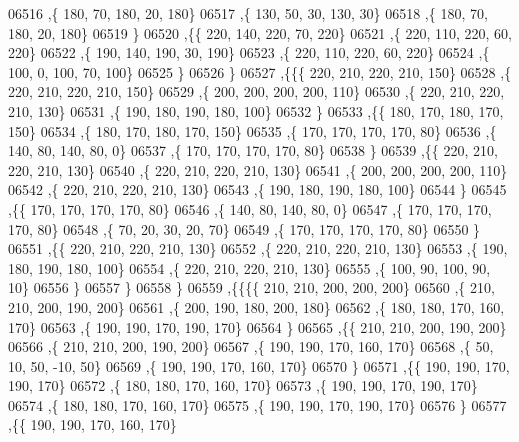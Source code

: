 \begin{DoxyCode}
06516     ,\{   180,    70,   180,    20,   180\}
06517     ,\{   130,    50,    30,   130,    30\}
06518     ,\{   180,    70,   180,    20,   180\}
06519     \}
06520    ,\{\{   220,   140,   220,    70,   220\}
06521     ,\{   220,   110,   220,    60,   220\}
06522     ,\{   190,   140,   190,    30,   190\}
06523     ,\{   220,   110,   220,    60,   220\}
06524     ,\{   100,     0,   100,    70,   100\}
06525     \}
06526    \}
06527   ,\{\{\{   220,   210,   220,   210,   150\}
06528     ,\{   220,   210,   220,   210,   150\}
06529     ,\{   200,   200,   200,   200,   110\}
06530     ,\{   220,   210,   220,   210,   130\}
06531     ,\{   190,   180,   190,   180,   100\}
06532     \}
06533    ,\{\{   180,   170,   180,   170,   150\}
06534     ,\{   180,   170,   180,   170,   150\}
06535     ,\{   170,   170,   170,   170,    80\}
06536     ,\{   140,    80,   140,    80,     0\}
06537     ,\{   170,   170,   170,   170,    80\}
06538     \}
06539    ,\{\{   220,   210,   220,   210,   130\}
06540     ,\{   220,   210,   220,   210,   130\}
06541     ,\{   200,   200,   200,   200,   110\}
06542     ,\{   220,   210,   220,   210,   130\}
06543     ,\{   190,   180,   190,   180,   100\}
06544     \}
06545    ,\{\{   170,   170,   170,   170,    80\}
06546     ,\{   140,    80,   140,    80,     0\}
06547     ,\{   170,   170,   170,   170,    80\}
06548     ,\{    70,    20,    30,    20,    70\}
06549     ,\{   170,   170,   170,   170,    80\}
06550     \}
06551    ,\{\{   220,   210,   220,   210,   130\}
06552     ,\{   220,   210,   220,   210,   130\}
06553     ,\{   190,   180,   190,   180,   100\}
06554     ,\{   220,   210,   220,   210,   130\}
06555     ,\{   100,    90,   100,    90,    10\}
06556     \}
06557    \}
06558   \}
06559  ,\{\{\{\{   210,   210,   200,   200,   200\}
06560     ,\{   210,   210,   200,   190,   200\}
06561     ,\{   200,   190,   180,   200,   180\}
06562     ,\{   180,   180,   170,   160,   170\}
06563     ,\{   190,   190,   170,   190,   170\}
06564     \}
06565    ,\{\{   210,   210,   200,   190,   200\}
06566     ,\{   210,   210,   200,   190,   200\}
06567     ,\{   190,   190,   170,   160,   170\}
06568     ,\{    50,    10,    50,   -10,    50\}
06569     ,\{   190,   190,   170,   160,   170\}
06570     \}
06571    ,\{\{   190,   190,   170,   190,   170\}
06572     ,\{   180,   180,   170,   160,   170\}
06573     ,\{   190,   190,   170,   190,   170\}
06574     ,\{   180,   180,   170,   160,   170\}
06575     ,\{   190,   190,   170,   190,   170\}
06576     \}
06577    ,\{\{   190,   190,   170,   160,   170\}

\end{DoxyCode}
